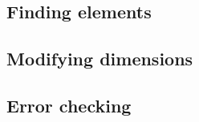 
\subsection{Finding elements \label{SEC:support:generic:find}}


\subsection{Modifying dimensions \label{SEC:support:generic:dims}}


\subsection{Error checking \label{SEC:support:generic:error}}

